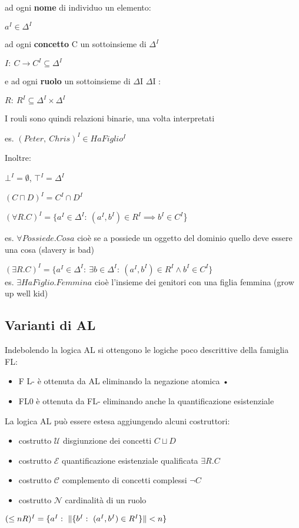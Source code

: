 ad ogni \textbf{nome} di individuo un elemento: 

$a^{I}\in\Delta^{I}$

ad ogni \textbf{concetto} C un sottoinsieme di $\Delta^{I}$

$I:\ C\rightarrow C^{I}\subseteq\Delta^{I}$

e ad ogni \textbf{ruolo} un sottoinsieme di $\Delta$I \texttimes{}
$\Delta$I :

$R:\ R^{I}\subseteq\Delta^{I}\times\Delta^{I}$

I rouli sono quindi relazioni binarie, una volta interpretati

es. $(Peter,\ Chris)^{I}\in HaFiglio^{I}$

		

Inoltre:

$\bot^{I}=\emptyset$, $\top^{I}=\Delta^{I}$

$(C\sqcap D)^{I}=C^{I}\cap D^{I}$

$(\forall R.C)^{I}=\{a^{I}\in\Delta^{I}:\ (a^{I},b^{I})\in R^{I}\implies b^{I}\in C^{I}$\} 

es. $\forall Possiede.Cosa$ cioè se a possiede un oggetto del dominio
quello deve essere una cosa (slavery is bad)

$(\exists R.C)^{I}=\{a^{I}\in\Delta^{I}:\ \exists b\in\Delta^{I}:\ (a^{I},b^{I})\in R^{I}\wedge b^{I}\in C^{I}\}$\\


es. $\exists HaFiglio.Femmina$ cioè l'insieme dei genitori con una
figlia femmina (grow up well kid)\\



\subsection{Varianti di AL}

Indebolendo la logica AL si ottengono le logiche poco descrittive
della famiglia FL:
\begin{itemize}
\item F L- è ottenuta da AL eliminando la negazione atomica •
\item FL0 è ottenuta da FL- eliminando anche la quantificazione esistenziale
\end{itemize}
La logica AL può essere estesa aggiungendo alcuni costruttori: 
\begin{itemize}
\item costrutto $\mathcal{U}$ disgiunzione dei concetti $C\sqcup D$
\item costrutto $\mathcal{E}$ quantificazione esistenziale qualificata
$\exists R.C$
\item costrutto $\mathcal{C}$ complemento di concetti complessi $\neg C$
\item costrutto $\mathcal{N}$ cardinalità di un ruolo 
\end{itemize}
$(\leq nR)^{I}=\{a^{I}:\ \cardinal{\{b^{I}:\ (a^{I},b^{I})\in R^{I}\}}<n\}$

